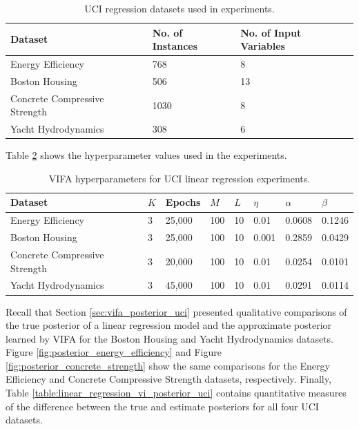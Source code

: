 \documentclass[10pt]{article} %
\begin{document}
\begin{table}[h!]
\caption{UCI regression datasets used in experiments.}
\begin{center}
\begin{tabular}{l|ll}
\label{table:uci_datasets}
\textbf{Dataset}              & \textbf{No. of Instances} & \textbf{No. of Input Variables} \\ \hline
Energy Efficiency             & 768                       & 8                               \\
Boston Housing                & 506                       & 13                              \\
Concrete Compressive Strength & 1030                      & 8                               \\
Yacht Hydrodynamics           & 308                       & 6                    
\end{tabular}
\end{center}
\end{table}

Table \ref{table:vifa_uci_hyperparameters} shows the hyperparameter values used in the experiments.
\begin{table}[h!]
\caption{VIFA hyperparameters for UCI linear regression experiments.}
\begin{center}
\label{table:vifa_uci_hyperparameters}
\begin{tabular}{l|lllllll}
\textbf{Dataset} & \textbf{$K$} & \textbf{Epochs} & \textbf{$M$} & \textbf{$L$} & \textbf{$\eta$} & \textbf{$\alpha$} & \textbf{$\beta$} \\ \hline
Energy Efficiency 				& 3 & 25,000 & 100 & 10 	& 0.01 	& 0.0608 & 0.1246 \\ 
Boston Housing 				& 3 & 25,000 & 100 & 10 	& 0.001 	& 0.2859 & 0.0429 \\
 Concrete Compressive Strength	& 3 & 20,000 & 100 & 10 	& 0.01 	& 0.0254 & 0.0101 \\
 Yacht Hydrodynamics 			& 3 & 45,000 & 100 & 10 	& 0.01 	& 0.0291 & 0.0114 \\
\end{tabular}
\end{center}
\end{table}

Recall that Section \ref{sec:vifa_posterior_uci} presented qualitative comparisons of the true posterior of a linear regression model and the approximate posterior learned by VIFA for the Boston Housing and Yacht Hydrodynamics datasets. Figure \ref{fig:posterior_energy_efficiency} and Figure \ref{fig:posterior_concrete_strength} show the same comparisons for the Energy Efficiency and Concrete Compressive Strength datasets, respectively. Finally, Table \ref{table:linear_regression_vi_posterior_uci} contains quantitative measures of the difference between the true and estimate posteriors for all four UCI datasets. 
\end{document}
